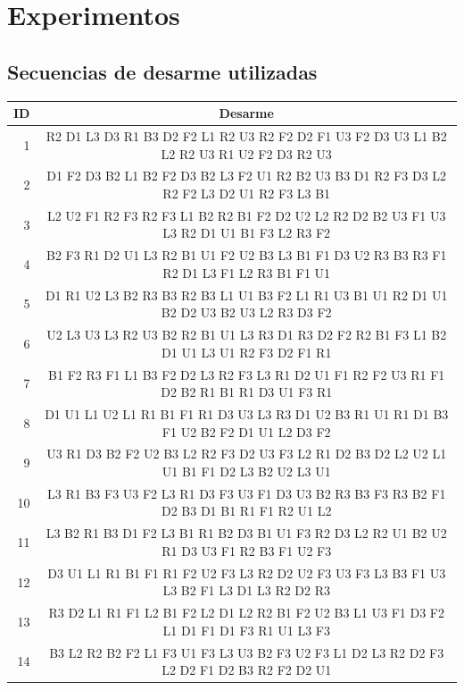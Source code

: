 \section{Experimentos}
\subsection{Secuencias de desarme utilizadas}

\begin{table}
	\centering
	\begin{tabular}{|r|c|}
		\hline
		ID & Desarme \\ \hline \hline
		 1 & R2 D1 L3 D3 R1 B3 D2 F2 L1 R2 U3 R2 F2 D2 F1 U3 F2 D3 U3 L1 B2 L2 R2 U3 R1 U2 F2 D3 R2 U3 \\ \hline
		 2 & D1 F2 D3 B2 L1 B2 F2 D3 B2 L3 F2 U1 R2 B2 U3 B3 D1 R2 F3 D3 L2 R2 F2 L3 D2 U1 R2 F3 L3 B1 \\ \hline
		 3 & L2 U2 F1 R2 F3 R2 F3 L1 B2 R2 B1 F2 D2 U2 L2 R2 D2 B2 U3 F1 U3 L3 R2 D1 U1 B1 F3 L2 R3 F2 \\ \hline
		 4 & B2 F3 R1 D2 U1 L3 R2 B1 U1 F2 U2 B3 L3 B1 F1 D3 U2 R3 B3 R3 F1 R2 D1 L3 F1 L2 R3 B1 F1 U1 \\ \hline
		 5 & D1 R1 U2 L3 B2 R3 B3 R2 B3 L1 U1 B3 F2 L1 R1 U3 B1 U1 R2 D1 U1 B2 D2 U3 B2 U3 L2 R3 D3 F2 \\ \hline
		 6 & U2 L3 U3 L3 R2 U3 B2 R2 B1 U1 L3 R3 D1 R3 D2 F2 R2 B1 F3 L1 B2 D1 U1 L3 U1 R2 F3 D2 F1 R1 \\ \hline
		 7 & B1 F2 R3 F1 L1 B3 F2 D2 L3 R2 F3 L3 R1 D2 U1 F1 R2 F2 U3 R1 F1 D2 B2 R1 B1 R1 D3 U1 F3 R1 \\ \hline
		 8 & D1 U1 L1 U2 L1 R1 B1 F1 R1 D3 U3 L3 R3 D1 U2 B3 R1 U1 R1 D1 B3 F1 U2 B2 F2 D1 U1 L2 D3 F2 \\ \hline
		 9 & U3 R1 D3 B2 F2 U2 B3 L2 R2 F3 D2 U3 F3 L2 R1 D2 B3 D2 L2 U2 L1 U1 B1 F1 D2 L3 B2 U2 L3 U1 \\ \hline
		10 & L3 R1 B3 F3 U3 F2 L3 R1 D3 F3 U3 F1 D3 U3 B2 R3 B3 F3 R3 B2 F1 D2 B3 D1 B1 R1 F1 R2 U1 L2 \\ \hline
		11 & L3 B2 R1 B3 D1 F2 L3 B1 R1 B2 D3 B1 U1 F3 R2 D3 L2 R2 U1 B2 U2 R1 D3 U3 F1 R2 B3 F1 U2 F3 \\ \hline
		12 & D3 U1 L1 R1 B1 F1 R1 F2 U2 F3 L3 R2 D2 U2 F3 U3 F3 L3 B3 F1 U3 L3 B2 F1 L3 D1 L3 R2 D2 R3 \\ \hline
		13 & R3 D2 L1 R1 F1 L2 B1 F2 L2 D1 L2 R2 B1 F2 U2 B3 L1 U3 F1 D3 F2 L1 D1 F1 D1 F3 R1 U1 L3 F3 \\ \hline
		14 & B3 L2 R2 B2 F2 L1 F3 U1 F3 L3 U3 B2 F3 U2 F3 L1 D2 L3 R2 D2 F3 L2 D2 F1 D2 B3 R2 F2 D2 U1 \\ \hline

\end{tabular}
\end{table}
